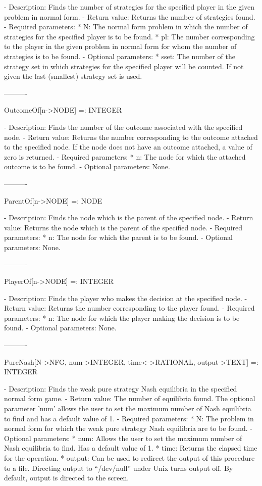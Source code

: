    -	Description:  Finds the number of strategies for the specified player 
	in the given problem in normal form.
   -	Return value:  Returns the number of strategies found.
   -	Required parameters:
	  *  N:  The normal form problem in which the number of strategies for
		the specified player is to be found.
	  *  pl:  The number corresponding to the player in the given problem 
		in normal form for whom the number of strategies is to be
		found.
   -	Optional parameters:
	  *  sset:  The number of the strategy set in which strategies for the
		specified player will be counted.  If not given the last
		(smallest) strategy set is used.

----------

OutcomeOf[n->NODE] =: INTEGER

   -	Description:  Finds the number of the outcome associated with the 
	specified node.
   -	Return value:  Returns the number corresponding to the outcome attached
	to the specified node.  If the node does not have an outcome attached,
	a value of zero is returned.
   -	Required parameters:
	  *  n:  The node for which the attached outcome is to be found.
   -	Optional parameters:  None.

----------

ParentOf[n->NODE] =: NODE

   -	Description:  Finds the node which is the parent of the specified node.
   -	Return value:  Returns the node which is the parent of the specified
	node.
   -	Required parameters:
	  *  n:  The node for which the parent is to be found.
   -	Optional parameters:  None.

----------

PlayerOf[n->NODE] =: INTEGER

   -	Description:  Finds the player who makes the decision at the specified
	node.
   -	Return value:  Returns the number corresponding to the player found.
   -	Required parameters:
	  *  n:  The node for which the player making the decision is to be
		found.
   -	Optional parameters:  None.

----------

PureNash[N->NFG, {num->INTEGER}, {time<->RATIONAL}, {output->TEXT}]
	 =: INTEGER

   -	Description:  Finds the weak pure strategy Nash equilibria in the 
	specified normal form game.  
   -	Return value:  The number of equilibria found.  The optional parameter 
	'num' allows the user to set the maximum number of Nash equilibria to 
	find and has a default value of 1.
   -	Required parameters:
	  *  N:  The problem in normal form for which the weak pure strategy
		Nash equilibria are to be found.
   -	Optional parameters:
	  *  num:  Allows the user to set the maximum number of Nash equilibria
		to find.  Has a default value of 1.
	  *  time:  Returns the elapsed time for the operation.
	  *  output:  Can be used to redirect the output of this procedure to a
		file.  Directing output to ``/dev/null'' under Unix turns 
		output off.  By default, output is directed to the screen.  

